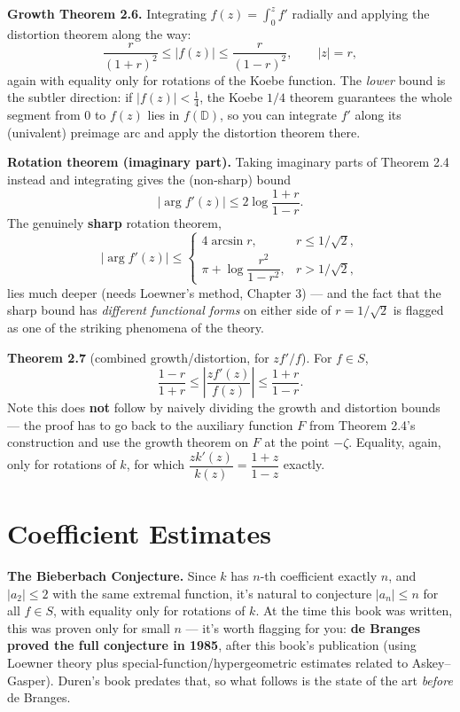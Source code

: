 \documentclass[
]{book}
\theoremstyle{definition}
\theoremstyle{definition}
\theoremstyle{definition}
\theoremstyle{definition}
\theoremstyle{remark}
\begin{document}
\textbf{Growth Theorem 2.6.} Integrating \(f(z) = \int_0^z f'\) radially and applying the distortion theorem along the way:
\[\frac{r}{(1+r)^2} \le |f(z)| \le \frac{r}{(1-r)^2}, \qquad |z|=r,\]
again with equality only for rotations of the Koebe function. The \emph{lower} bound is the subtler direction: if \(|f(z)|<\tfrac14\), the Koebe \(1/4\) theorem guarantees the whole segment from \(0\) to \(f(z)\) lies in \(f(\mathbb D)\), so you can integrate \(f'\) along its (univalent) preimage arc and apply the distortion theorem there.

\textbf{Rotation theorem (imaginary part).} Taking imaginary parts of Theorem 2.4 instead and integrating gives the (non-sharp) bound
\[|\arg f'(z)| \le 2\log\frac{1+r}{1-r}.\]
The genuinely \textbf{sharp} rotation theorem,
\[|\arg f'(z)| \le \begin{cases} 4\arcsin r, & r\le 1/\sqrt2,\\[4pt] \pi + \log\dfrac{r^2}{1-r^2}, & r>1/\sqrt2,\end{cases}\]
lies much deeper (needs Loewner's method, Chapter 3) --- and the fact that the sharp bound has \emph{different functional forms} on either side of \(r=1/\sqrt2\) is flagged as one of the striking phenomena of the theory.

\textbf{Theorem 2.7} (combined growth/distortion, for \(zf'/f\)). For \(f\in S\),
\[\frac{1-r}{1+r} \le \left|\frac{zf'(z)}{f(z)}\right| \le \frac{1+r}{1-r}.\]
Note this does \textbf{not} follow by naively dividing the growth and distortion bounds --- the proof has to go back to the auxiliary function \(F\) from Theorem 2.4's construction and use the growth theorem on \(F\) at the point \(-\zeta\). Equality, again, only for rotations of \(k\), for which \(\dfrac{zk'(z)}{k(z)} = \dfrac{1+z}{1-z}\) exactly.

\section{Coefficient Estimates}\label{coefficient-estimates}

\textbf{The Bieberbach Conjecture.} Since \(k\) has \(n\)-th coefficient exactly \(n\), and \(|a_2|\le2\) with the same extremal function, it's natural to conjecture \(|a_n|\le n\) for all \(f\in S\), with equality only for rotations of \(k\). At the time this book was written, this was proven only for small \(n\) --- it's worth flagging for you: \textbf{de Branges proved the full conjecture in 1985}, after this book's publication (using Loewner theory plus special-function/hypergeometric estimates related to Askey--Gasper). Duren's book predates that, so what follows is the state of the art \emph{before} de Branges.
\end{document}
